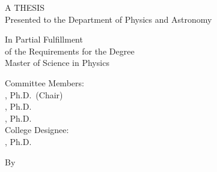 \begin{titlepage}
\begin{center}
  
      \MakeUppercase{ \textbf{\thesistitlename} }
      \vfill
        
      A THESIS \\  \bigskip
      Presented to the Department of Physics and Astronomy \\ \bigskip
      \univname
        
      \vfill
      
      In Partial Fulfillment\\
      \bigskip
      of the Requirements for the Degree\\
      \bigskip
      Master of Science in Physics\\
      
      \vfill
      
      Committee Members:\\
      \bigskip
      \advisorname, Ph.D.~(Chair)\\
      \memberonename, Ph.D.\\
      \membertwoname, Ph.D.\\
      \bigskip
      College Designee:\\
      \bigskip
      \deptchairname, Ph.D.
      
      \vfill
      
      By \authorname \\
      \bigskip
      \bsdegreename \\
      \bigskip
      \thesisdate
		
    \end{center}
\end{titlepage}
